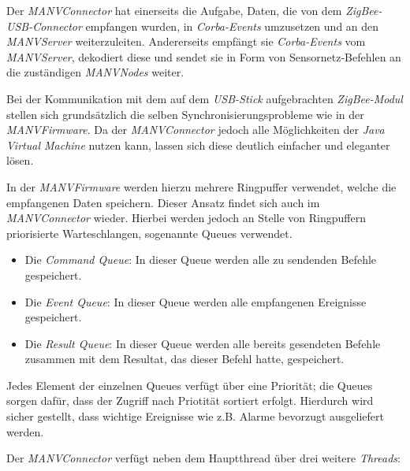 Der \emph{MANVConnector} hat einerseits die Aufgabe, Daten, die von dem \emph{ZigBee-USB-Connector} empfangen wurden, in 
\emph{Corba-Events} umzusetzen und an den \emph{MANVServer} weiterzuleiten. Andererseits empfängt sie 
\emph{Corba-Events} vom \emph{MANVServer}, dekodiert diese und sendet sie in Form von Sensornetz-Befehlen an die 
zuständigen \emph{MANVNodes} weiter.

Bei der Kommunikation mit dem auf dem \emph{USB-Stick} aufgebrachten \emph{ZigBee-Modul} stellen sich grundsätzlich 
die selben Synchronisierungsprobleme wie in der \emph{MANVFirmware}. Da der \emph{MANVConnector} jedoch alle 
Möglichkeiten der \emph{Java Virtual Machine} nutzen kann, lassen sich diese deutlich einfacher und eleganter lösen. 

In der \emph{MANVFirmware} werden hierzu mehrere Ringpuffer verwendet, welche die empfangenen Daten speichern. Dieser 
Ansatz findet sich auch im \emph{MANVConnector} wieder. Hierbei werden jedoch an Stelle von Ringpuffern priorisierte Warteschlangen, 
sogenannte Queues verwendet. 

\begin{itemize}
    \item{Die \emph{Command Queue}:} In dieser Queue werden alle zu sendenden Befehle gespeichert.
    \item{Die \emph{Event Queue}:} In dieser Queue werden alle empfangenen Ereignisse gespeichert.
    \item{Die \emph{Result Queue}:} In dieser Queue werden alle bereits gesendeten Befehle zusammen mit dem
                             Resultat, das dieser Befehl hatte, gespeichert.
\end{itemize}

Jedes Element der einzelnen Queues verfügt über eine Priorität; die Queues sorgen dafür, dass der
Zugriff nach Priotität sortiert erfolgt. Hierdurch wird sicher gestellt, dass wichtige Ereignisse
wie z.B. Alarme bevorzugt ausgeliefert werden.

Der \emph{MANVConnector} verfügt neben dem Hauptthread über drei weitere \emph{Threads}:

